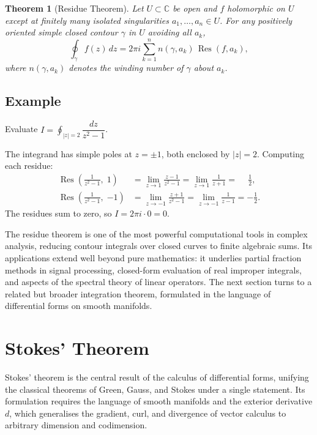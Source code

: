 \documentclass{article}
\newtheorem{theorem}{Theorem}[section]
\begin{document}
\begin{theorem}[Residue Theorem]
  Let $U \subset \mathbb{C}$ be open and $f$ holomorphic on $U$ except at finitely many
  isolated singularities $a_1, \ldots, a_n \in U$.  For any positively oriented simple
  closed contour $\gamma$ in $U$ avoiding all $a_k$,
  \begin{equation}
    \oint_{\gamma} f(z)\,dz
      = 2\pi i \sum_{k=1}^{n} n(\gamma, a_k)\,\operatorname{Res}(f, a_k),
  \end{equation}
  where $n(\gamma, a_k)$ denotes the winding number of $\gamma$ about $a_k$.
\end{theorem}

\subsection{Example}

Evaluate $\displaystyle I = \oint_{|z|=2} \dfrac{dz}{z^{2} - 1}$.

The integrand has simple poles at $z = \pm 1$, both enclosed by $|z| = 2$. Computing
each residue:
\begin{align}
  \operatorname{Res}\!\left(\tfrac{1}{z^{2}-1},\; 1\right)
    &= \lim_{z \to 1}  \frac{z - 1}{z^{2}-1}
     = \lim_{z \to 1}  \frac{1}{z+1}
     = \phantom{-}\frac{1}{2}, \\[4pt]
  \operatorname{Res}\!\left(\tfrac{1}{z^{2}-1},\; {-1}\right)
    &= \lim_{z \to -1} \frac{z + 1}{z^{2}-1}
     = \lim_{z \to -1} \frac{1}{z-1}
     = -\frac{1}{2}.
\end{align}
The residues sum to zero, so $I = 2\pi i \cdot 0 = 0$.

The residue theorem is one of the most powerful computational tools in complex
analysis, reducing contour integrals over closed curves to finite algebraic sums.
Its applications extend well beyond pure mathematics: it underlies partial fraction
methods in signal processing, closed-form evaluation of real improper integrals,
and aspects of the spectral theory of linear operators. The next section turns to
a related but broader integration theorem, formulated in the language of differential
forms on smooth manifolds.

\section{Stokes' Theorem}

Stokes' theorem is the central result of the calculus of differential forms,
unifying the classical theorems of Green, Gauss, and Stokes under a single statement.
Its formulation requires the language of smooth manifolds and the exterior derivative
$d$, which generalises the gradient, curl, and divergence of vector calculus to
arbitrary dimension and codimension.
\end{document}

